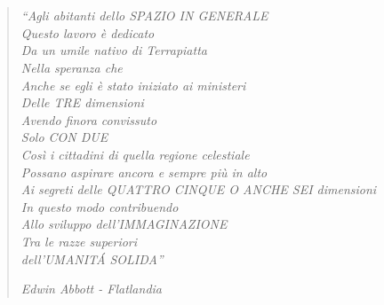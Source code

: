 
	\chapter*{}
		\begin{quote}
			
			\emph{``Agli abitanti dello SPAZIO IN GENERALE\\
			Questo lavoro è dedicato\\
			Da un umile nativo di Terrapiatta\\
			Nella speranza che\\
			Anche se egli è stato iniziato ai ministeri\\
			Delle TRE dimensioni\\
			Avendo finora convissuto\\
			Solo CON DUE\\
			Così i cittadini di quella regione celestiale\\
			Possano aspirare ancora e sempre più in alto\\
			Ai segreti delle QUATTRO CINQUE O ANCHE SEI dimensioni\\
			In questo modo contribuendo\\
			Allo sviluppo dell'IMMAGINAZIONE\\
			Tra le razze superiori\\
			dell'UMANIT\'A SOLIDA''\\}
		
			\hfill\textit{Edwin Abbott - Flatlandia}						
			
		\end{quote}
